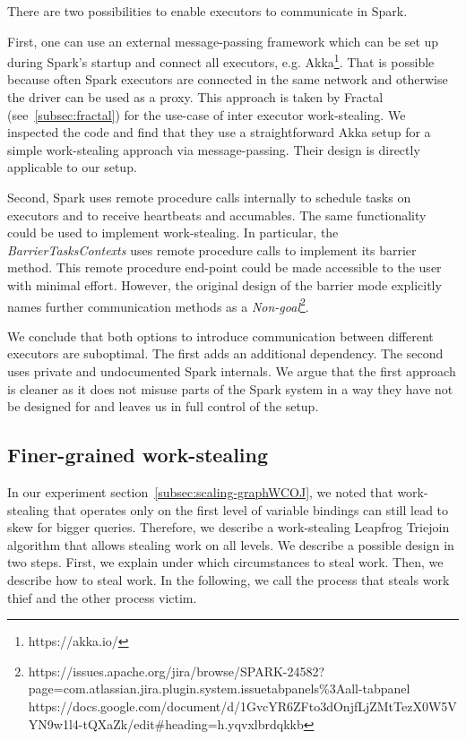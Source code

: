 There are two possibilities to enable executors to communicate in Spark.

First, one can use an external message-passing framework which can be set up during Spark's startup and connect all executors, e.g.
Akka\footnote{https://akka.io/}.
That is possible because often Spark executors are connected in the same network and otherwise the driver can be used as a proxy.
This approach is taken by Fractal (see~\cref{subsec:fractal}) for the use-case of inter executor work-stealing.
We inspected the code and find that they use a straightforward Akka setup for a simple work-stealing approach via message-passing.
Their design is directly applicable to our setup.

Second, Spark uses remote procedure calls internally to schedule tasks on executors and to receive heartbeats and accumables.
The same functionality could be used to implement work-stealing.
In particular, the \textit{BarrierTasksContexts} uses remote procedure calls to implement its barrier method.
This remote procedure end-point could be made accessible to the user with minimal effort.
However, the original design of the barrier mode explicitly names further communication methods as a \textit{Non-goal}\footnote{
https://issues.apache.org/jira/browse/SPARK-24582?page=com.atlassian.jira.plugin.system.issuetabpanels\%3Aall-tabpanel\\
https://docs.google.com/document/d/1GvcYR6ZFto3dOnjfLjZMtTezX0W5VYN9w1l4-tQXaZk/edit\#heading=h.yqvxlbrdqkkb}.

We conclude that both options to introduce communication between different executors are suboptimal.
The first adds an additional dependency.
The second uses private and undocumented Spark internals.
We argue that the first approach is cleaner as it does not misuse parts of the Spark system in a way they have not be designed for
and leaves us in full control of the setup.

\subsection{Finer-grained work-stealing} \label{subsubsec:finer-grained-work-stealing}
In our experiment section~\ref{subsec:scaling-graphWCOJ}, we noted that work-stealing that
operates only on the first level of variable bindings can still lead to skew for bigger queries.
Therefore, we describe a work-stealing Leapfrog Triejoin algorithm that allows stealing work
on all levels.
We describe a possible design in two steps.
First, we explain under which circumstances to steal work.
Then, we describe how to steal work.
In the following, we call the process that steals work thief and the other process
victim.

